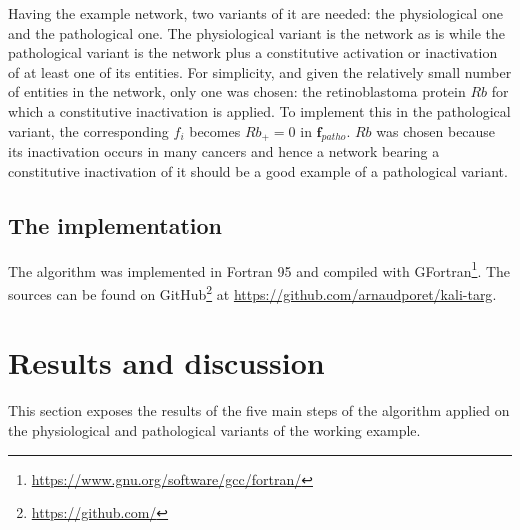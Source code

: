 \documentclass[oneside,a4paper,onecolumn,notitlepage]{article}
\begin{document}
Having the example network, two variants of it are needed: the physiological one and the pathological one. The physiological variant is the network as is while the pathological variant is the network plus a constitutive activation or inactivation of at least one of its entities. For simplicity, and given the relatively small number of entities in the network, only one was chosen: the retinoblastoma protein $Rb$ for which a constitutive inactivation is applied. To implement this in the pathological variant, the corresponding $f_i$ becomes $Rb_{+}=0$ in $\boldsymbol{f}_{patho}$.
$Rb$ was chosen because its inactivation occurs in many cancers \cite{sherr2002rb} and hence a network bearing a constitutive inactivation of it should be a good example of a pathological variant.

\subsection*{The implementation}
The algorithm was implemented in Fortran 95 and compiled with GFortran\footnote{\url{https://www.gnu.org/software/gcc/fortran/}}. The sources can be found on GitHub\footnote{\url{https://github.com/}} at \url{https://github.com/arnaudporet/kali-targ}.

\section*{Results and discussion}
This section exposes the results of the five main steps of the algorithm applied on the physiological and pathological variants of the working example.
\end{document}

